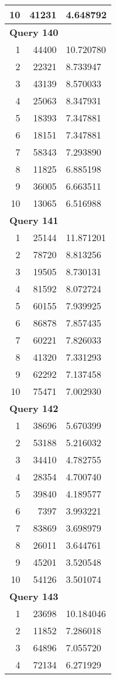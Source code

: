 \begin{longtable}[{p}]{@{}rrp{}@{}}
10 & 41231 & 4.648792 \\
\midrule
\multicolumn{3}{l}{\bfseries Query 140} \\
1 & 44400 & 10.720780 \\
2 & 22321 & 8.733947 \\
3 & 43139 & 8.570033 \\
4 & 25063 & 8.347931 \\
5 & 18393 & 7.347881 \\
6 & 18151 & 7.347881 \\
7 & 58343 & 7.293890 \\
8 & 11825 & 6.885198 \\
9 & 36005 & 6.663511 \\
10 & 13065 & 6.516988 \\
\midrule
\multicolumn{3}{l}{\bfseries Query 141} \\
1 & 25144 & 11.871201 \\
2 & 78720 & 8.813256 \\
3 & 19505 & 8.730131 \\
4 & 81592 & 8.072724 \\
5 & 60155 & 7.939925 \\
6 & 86878 & 7.857435 \\
7 & 60221 & 7.826033 \\
8 & 41320 & 7.331293 \\
9 & 62292 & 7.137458 \\
10 & 75471 & 7.002930 \\
\midrule
\multicolumn{3}{l}{\bfseries Query 142} \\
1 & 38696 & 5.670399 \\
2 & 53188 & 5.216032 \\
3 & 34410 & 4.782755 \\
4 & 28354 & 4.700740 \\
5 & 39840 & 4.189577 \\
6 & 7397 & 3.993221 \\
7 & 83869 & 3.698979 \\
8 & 26011 & 3.644761 \\
9 & 45201 & 3.520548 \\
10 & 54126 & 3.501074 \\
\midrule
\multicolumn{3}{l}{\bfseries Query 143} \\
1 & 23698 & 10.184046 \\
2 & 11852 & 7.286018 \\
3 & 64896 & 7.055720 \\
4 & 72134 & 6.271929 \\

\end{longtable}
